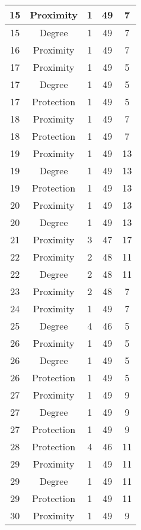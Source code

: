 \documentclass[results.tex]{subfiles}
\begin{document}
\begin{center}
\begin{tabular}{| c || c | c | c | c |}
    \hline
    15 & Proximity & 1 & 49 & 7 \\ 
    \hline
    15 & Degree & 1 & 49 & 7 \\ 
    \hline
    16 & Proximity & 1 & 49 & 7 \\ 
    \hline
    17 & Proximity & 1 & 49 & 5 \\ 
    \hline
    17 & Degree & 1 & 49 & 5 \\ 
    \hline
    17 & Protection & 1 & 49 & 5 \\ 
    \hline
    18 & Proximity & 1 & 49 & 7 \\ 
    \hline
    18 & Protection & 1 & 49 & 7 \\ 
    \hline
    19 & Proximity & 1 & 49 & 13 \\ 
    \hline
    19 & Degree & 1 & 49 & 13 \\ 
    \hline
    19 & Protection & 1 & 49 & 13 \\ 
    \hline
    20 & Proximity & 1 & 49 & 13 \\ 
    \hline
    20 & Degree & 1 & 49 & 13 \\ 
    \hline
    21 & Proximity & 3 & 47 & 17 \\ 
    \hline
    22 & Proximity & 2 & 48 & 11 \\ 
    \hline
    22 & Degree & 2 & 48 & 11 \\ 
    \hline
    23 & Proximity & 2 & 48 & 7 \\ 
    \hline
    24 & Proximity & 1 & 49 & 7 \\ 
    \hline
    25 & Degree & 4 & 46 & 5 \\ 
    \hline
    26 & Proximity & 1 & 49 & 5 \\ 
    \hline
    26 & Degree & 1 & 49 & 5 \\ 
    \hline
    26 & Protection & 1 & 49 & 5 \\ 
    \hline
    27 & Proximity & 1 & 49 & 9 \\ 
    \hline
    27 & Degree & 1 & 49 & 9 \\ 
    \hline
    27 & Protection & 1 & 49 & 9 \\ 
    \hline
    28 & Protection & 4 & 46 & 11 \\ 
    \hline
    29 & Proximity & 1 & 49 & 11 \\ 
    \hline
    29 & Degree & 1 & 49 & 11 \\ 
    \hline
    29 & Protection & 1 & 49 & 11 \\ 
    \hline
    30 & Proximity & 1 & 49 & 9 \\ 

\end{tabular}
\end{center}
\end{document}
